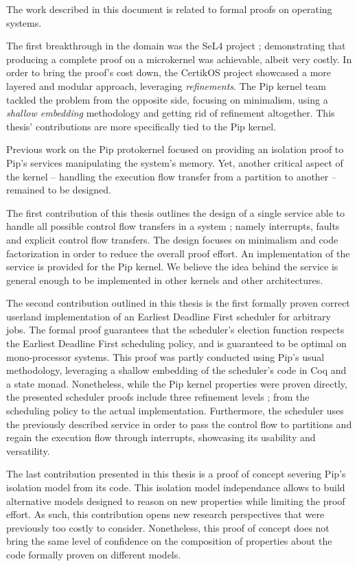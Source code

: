 \vfil

The work described in this document is related to formal proofs on operating systems.

The first breakthrough in the domain was the SeL4 project ; demonstrating that producing a complete proof on a microkernel was achievable, albeit very costly. 
In order to bring the proof's cost down, the CertikOS project showcased a more layered and modular approach, leveraging \emph{refinements}.
The Pip kernel team tackled the problem from the opposite side, focusing on minimalism, using a \emph{shallow embedding} methodology and getting rid of refinement altogether. This thesis' contributions are more specifically tied to the Pip kernel.

Previous work on the Pip protokernel focused on providing an isolation proof to Pip's services manipulating the system's memory. Yet, another critical aspect of the kernel -- handling the execution flow transfer from a partition to another -- remained to be designed.

The first contribution of this thesis outlines the design of a single service able to handle all possible control flow transfers in a system ; namely interrupts, faults and explicit control flow transfers. The design focuses on minimalism and code factorization in order to reduce the overall proof effort. An implementation of the service is provided for the Pip kernel. We believe the idea behind the service is general enough to be implemented in other kernels and other architectures.

The second contribution outlined in this thesis is the first formally proven correct userland implementation of an Earliest Deadline First scheduler for arbitrary jobs. The formal proof guarantees that the scheduler's election function respects the Earliest Deadline First scheduling policy, and is guaranteed to be optimal on mono-processor systems. This proof was partly conducted using Pip's usual methodology, leveraging a shallow embedding of the scheduler's code in Coq and a state monad. Nonetheless, while the Pip kernel properties were proven directly, the presented scheduler proofs include three refinement levels ; from the scheduling policy to the actual implementation. Furthermore, the scheduler uses the previously described service in order to pass the control flow to partitions and regain the execution flow through interrupts, showcasing its usability and versatility.

The last contribution presented in this thesis is a proof of concept severing Pip's isolation model from its code. This isolation model independance allows to build alternative models designed to reason on new properties while limiting the proof effort. As such, this contribution opens new research perspectives that were previously too costly to consider. Nonetheless, this proof of concept does not bring the same level of confidence on the composition of properties about the code formally proven on different models.

\vfil
